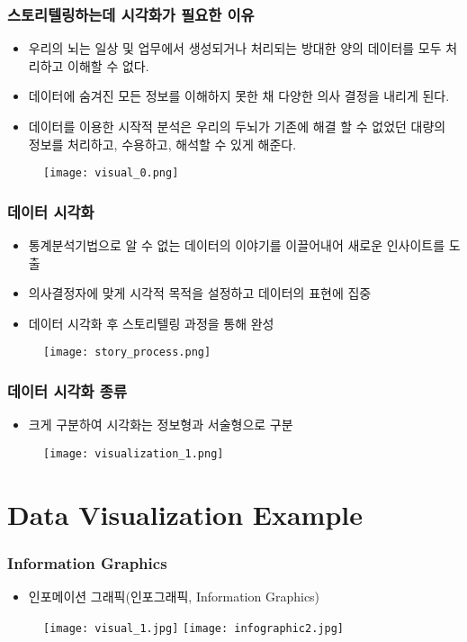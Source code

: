 \documentclass[10pt]{beamer}
\begin{document}
\begin{frame}
\frametitle{스토리텔링하는데 시각화가 필요한 이유}
\begin{itemize}

	\item 우리의 뇌는 일상 및 업무에서 생성되거나 처리되는 방대한 양의 데이터를 모두 처리하고 이해할 수 없다.
	\item 데이터에 숨겨진 모든 정보를 이해하지 못한 채 다양한 의사 결정을 내리게 된다.\\
	\item 데이터를 이용한 시작적 분석은 우리의 두뇌가 기존에 해결 할 수 없었던 대량의 정보를 처리하고, 수용하고, 해석할 수 있게 해준다.

\end{itemize}
	\begin{figure}
		\texttt{[image: visual\_0.png]}
	\end{figure}
\end{frame}

\begin{frame}
\frametitle{데이터 시각화}
\begin{itemize}
	\item 통계분석기법으로 알 수 없는 데이터의 이야기를 이끌어내어 새로운 인사이트를 도출
	\item 의사결정자에 맞게 시각적 목적을 설정하고 데이터의 표현에 집중
	\item 데이터 시각화 후 스토리텔링 과정을 통해 완성
\end{itemize}
	\begin{figure}
		\texttt{[image: story\_process.png]}
	\end{figure}

\end{frame}

\begin{frame}
\frametitle{데이터 시각화 종류}
\begin{itemize}
	\item 크게 구분하여 시각화는 정보형과 서술형으로 구분
\end{itemize}
	\begin{figure}
		\texttt{[image: visualization\_1.png]}
	\end{figure}

\end{frame}

\section{Data Visualization Example}
\begin{frame}
\frametitle{Information Graphics}
	\begin{itemize}
		\item 인포메이션 그래픽(인포그래픽, Information Graphics)
	\end{itemize}
	\begin{figure}
		\texttt{[image: visual\_1.jpg]}
		\texttt{[image: infographic2.jpg]}
	\end{figure}
\end{frame}
\end{document}

